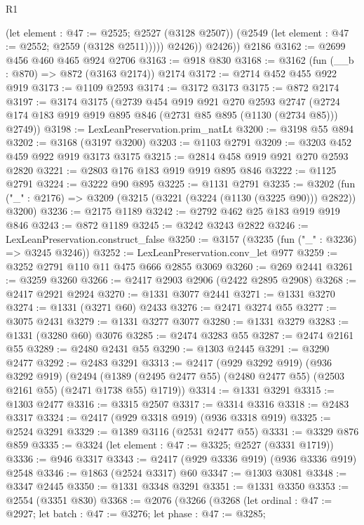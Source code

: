 \begin{lexlean}{R1}
\begin{coremodule}
                (let element : @47 := @2525; @2527 (@3128 @2507))
                (@2549 (let element : @47 := @2552; @2559 (@3128 @2511)))))
            @2426))
        @2426))
    @2186
@3162 := @2699 @456 @460 @465 @924 @2706
@3163 := @918 @830
@3168 := @3162 (fun (__b : @870) => @872 (@3163 @2174)) @2174
@3172 := @2714 @452 @455 @922 @919
@3173 := @1109 @2593
@3174 := @3172 @3173
@3175 := @872 @2174
@3197 := @3174
    @3175
    (@2739
      @454
      @919
      @921
      @270
      @2593
      @2747
      (@2724 @174 @183 @919 @919 @895 @846 (@2731 @85 @895 (@1130 (@2734 @85))) @2749))
@3198 := LexLeanPreservation.prim_natLt
@3200 := @3198 @55 @894
@3202 := @3168 (@3197 @3200)
@3203 := @1103 @2791
@3209 := @3203 @452 @459 @922 @919 @3173 @3175
@3215 := @2814 @458 @919 @921 @270 @2593 @2820
@3221 := @2803 @176 @183 @919 @919 @895 @846
@3222 := @1125 @2791
@3224 := @3222 @90 @895
@3225 := @1131 @2791
@3235 := @3202 (fun ("_" : @2176) => @3209 (@3215 (@3221 (@3224 (@1130 (@3225 @90))) @2822)) @3200)
@3236 := @2175 @1189
@3242 := @2792 @462 @25 @183 @919 @919 @846
@3243 := @872 @1189
@3245 := @3242 @3243 @2822
@3246 := LexLeanPreservation.construct_false
@3250 := @3157 (@3235 (fun ("_" : @3236) => @3245 @3246))
@3252 := LexLeanPreservation.conv_let @977
@3259 := @3252 @2791 @110 @11 @475 @666 @2855 @3069
@3260 := @269 @2441
@3261 := @3259 @3260
@3266 := @2417 @2903 @2906 (@2422 @2895 @2908)
@3268 := @2417 @2921 @2924
@3270 := @1331 @3077 @2441
@3271 := @1331 @3270
@3274 := @1331 (@3271 @60) @2433
@3276 := @2471 @3274 @55
@3277 := @3075 @2431
@3279 := @1331 @3277 @3077
@3280 := @1331 @3279
@3283 := @1331 (@3280 @60) @3076
@3285 := @2474 @3283 @55
@3287 := @2474 @2161 @55
@3289 := @2480 @2431 @55
@3290 := @1303 @2445
@3291 := @3290 @2477
@3292 := @2483 @3291
@3313 := @2417
    (@929 @3292 @919)
    (@936 @3292 @919)
    (@2494 (@1389 (@2495 @2477 @55) (@2480 @2477 @55) (@2503 @2161 @55) (@2471 @1738 @55) @1719))
@3314 := @1331 @3291
@3315 := @1303 @2477
@3316 := @3315 @2507
@3317 := @3314 @3316
@3318 := @2483 @3317
@3324 := @2417 (@929 @3318 @919) (@936 @3318 @919)
@3325 := @2524 @3291
@3329 := @1389 @3116 (@2531 @2477 @55)
@3331 := @3329 @876 @859
@3335 := @3324 (let element : @47 := @3325; @2527 (@3331 @1719))
@3336 := @946 @3317
@3343 := @2417 (@929 @3336 @919) (@936 @3336 @919) @2548
@3346 := @1863 (@2524 @3317) @60
@3347 := @1303 @3081
@3348 := @3347 @2445
@3350 := @1331 @3348 @3291
@3351 := @1331 @3350
@3353 := @2554 (@3351 @830)
@3368 := @2076
    (@3266
      (@3268
        (let ordinal : @47 := @2927;
        let batch : @47 := @3276;
        let phase : @47 := @3285;

\end{coremodule}
\end{lexlean}
